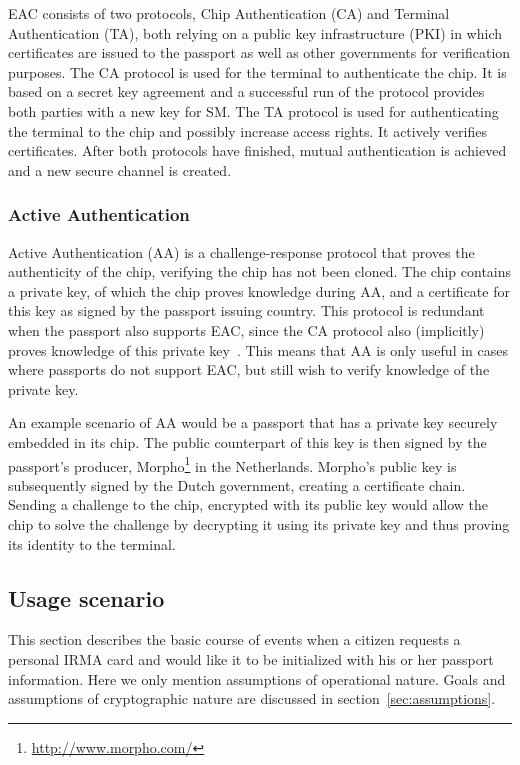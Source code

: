 EAC consists of two protocols, Chip Authentication (CA) and Terminal Authentication (TA), both relying on a public key infrastructure (PKI) in which certificates are issued to the passport as well as other governments for verification purposes. The CA protocol is used for the terminal to authenticate the chip. It is based on a secret key agreement and a successful run of the protocol provides both parties with a new key for SM. The TA protocol is used for authenticating the terminal to the chip and possibly increase access rights. It actively verifies certificates. After both protocols have finished, mutual authentication is achieved and a new secure channel is created.

\subsubsection{Active Authentication}
Active Authentication (AA) is a challenge-response protocol that proves the authenticity of the chip, verifying the chip has not been cloned. The chip contains a private key, of which the chip proves knowledge during AA, and a certificate for this key as signed by the passport issuing country. This protocol is redundant when the passport also supports EAC, since the CA protocol also (implicitly) proves knowledge of this private key~\cite{secprivepassport}. This means that AA is only useful in cases where passports do not support EAC, but still wish to verify knowledge of the private key.

An example scenario of AA would be a passport that has a private key securely embedded in its chip. The public counterpart of this key is then signed by the passport's producer, Morpho\footnote{\url{http://www.morpho.com/}} in the Netherlands. Morpho's public key is subsequently signed by the Dutch government, creating a certificate chain. Sending a challenge to the chip, encrypted with its public key would allow the chip to solve the challenge by decrypting it using its private key and thus proving its identity to the terminal.

\subsection{Usage scenario}
\label{subsec:bcoe}
This section describes the basic course of events when a citizen requests a personal IRMA card and would like it to be initialized with his or her passport information. Here we only mention assumptions of operational nature. Goals and assumptions of cryptographic nature are discussed in section~\ref{sec:assumptions}. 

